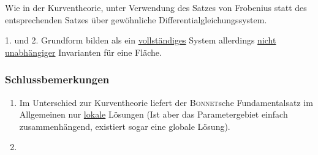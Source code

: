 \begin{beweis}
 Wie in der Kurventheorie, unter Verwendung des Satzes von Frobenius statt des entsprechenden Satzes über gewöhnliche Differentialgleichungssystem. \par
 1. und 2. Grundform bilden als ein \uline{vollständiges} System allerdings \uline{nicht unabhängiger} Invarianten für eine Fläche.
\end{beweis}
\subsubsection{Schlussbemerkungen}
\begin{enumerate}
 \item Im Unterschied zur Kurventheorie liefert der \textsc{Bonnet}sche Fundamentalsatz im Allgemeinen nur \uline{lokale} Lösungen (Ist aber das Parametergebiet einfach zusammenhängend, existiert sogar eine globale Lösung).
 \item
\end{enumerate}

